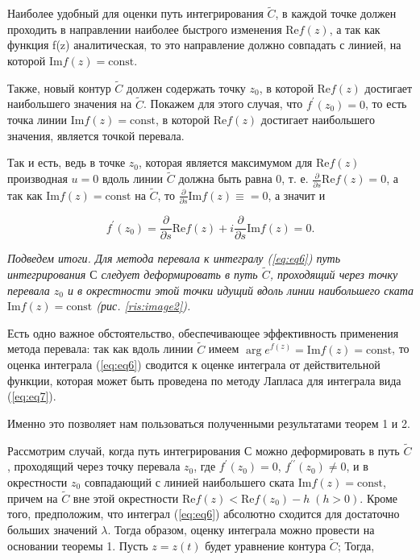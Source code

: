 \documentclass[14pt]{extarticle}
\renewcommand{\Re}{\mathrm{Re}}
\renewcommand{\Im}{\mathrm{Im}}
\newcommand{\const}{\mathrm{const}}
\renewcommand{\Re}{\mathrm{Re}}
\renewcommand{\Im}{\mathrm{Im}}
\begin{document}
	Наиболее удобный для оценки путь интегрирования $\widetilde{C}$, в каждой точке должен проходить в направлении наиболее быстрого изменения $\Re f(z)$, а так как функция f(z) аналитическая, то это направление должно совпадать с линией, на которой $\Im f(z) = \const$. 
	
	Также, новый контур $\widetilde{C}$ должен содержать точку $z_0$, в которой $\Re f(z)$ достигает наибольшего значения на $\widetilde{C}$. Покажем для этого случая, что $f^\prime (z_0) = 0$, то есть точка линии $\Im f(z) = \const$, в которой $\Re f (z)$ достигает наибольшего значения, является точкой перевала.
	
	Так и есть, ведь в точке $z_0$, которая является максимумом для $\Re f (z)$ производная $u=0$ вдоль линии $\widetilde{C}$ должна быть равна 0, т. е. $\frac{\partial}{\partial s}\Re f(z)=0$, а так как $\Im f(z) = \const$ на $\widetilde{C}$, то $\frac{\partial}{\partial s} \Im f(z) \equiv = 0$, а значит и 
	
	$$
	f^\prime(z_0) = \frac{\partial}{\partial s} \Re f(z) + i\frac{\partial}{\partial s} \Im f(z) = 0.
	$$ 
	
	\textit{Подведем итоги. Для метода перевала к интегралу (\ref{eq:eq6}) путь интегрирования $С$ следует деформировать в путь $\widetilde{C}$, проходящий через точку перевала $z_0$ и в окрестности этой точки идущий вдоль линии наибольшего ската $\Im f(z) = \const$ (рис. \ref{ris:image2}).}
	
	Есть одно важное обстоятельство, обеспечивающее эффективность применения метода перевала: так как вдоль линии $\widetilde{C}$ имеем $\arg e^{f(z)} = \Im f(z) = \const$, то оценка интеграла (\ref{eq:eq6}) сводится к оценке интеграла от действительной функции, которая может быть проведена по методу Лапласа для интеграла вида (\ref{eq:eq7}).  
	
	Именно это позволяет нам пользоваться полученными результатами теорем 1 и 2. 
	
	Рассмотрим  случай, когда путь интегрирования $С$ можно деформировать в путь $\widetilde{C}$, проходящий через точку перевала $z_0$, где $f^\prime(z_0) = 0$, $f^{\prime\prime}(z_0)\neq0$, и в окрестности $z_0$ совпадающий с линией наибольшего ската $\Im f(z) = \const$, причем на $\widetilde{C}$ вне этой окрестности $\Re f(z) < \Re f(z_0) - h \;(h> 0)$. Кроме того, предположим, что интеграл (\ref{eq:eq6}) абсолютно сходится для достаточно больших значений $\lambda$.
	Тогда образом, оценку интеграла можно провести на основании теоремы 1. Пусть $z = z(t)$ будет уравнение контура $\widetilde{C}$; Тогда,
	
\end{document}
